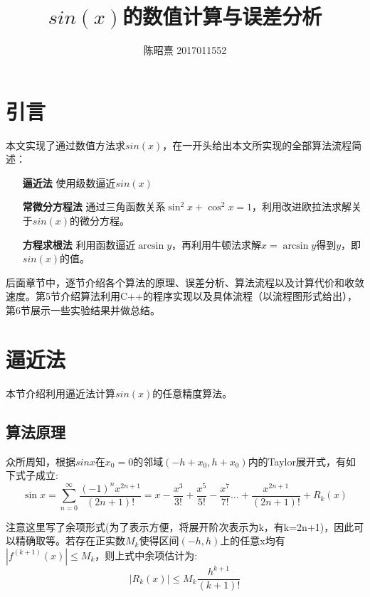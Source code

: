 \documentclass[UTF8]{ctexart}
\begin{document}
\title{$sin(x)$的数值计算与误差分析}
\author{陈昭熹 2017011552}
\maketitle
\tableofcontents
\newpage

\section{引言}
本文实现了通过数值方法求$sin(x)$，在一开头给出本文所实现的全部算法流程简述：
\begin{itemize}
    \item[\textbf{逼近法}] 使用级数逼近$sin(x)$
    \item[\textbf{常微分方程法}]通过三角函数关系$\sin^2{x}+\cos^2{x}=1$，利用改进欧拉法求解关于$sin(x)$的微分方程。
    \item[\textbf{方程求根法}] 利用函数逼近$\arcsin{y}$，再利用牛顿法求解$x=\arcsin{y}$得到$y$，即$sin(x)$的值。
\end{itemize}

后面章节中，逐节介绍各个算法的原理、误差分析、算法流程以及计算代价和收敛速度。第5节介绍算法利用C++的程序实现以及具体流程（以流程图形式给出），第6节展示一些实验结果并做总结。

\section{逼近法}

本节介绍利用逼近法计算$sin(x)$的任意精度算法。

\subsection{算法原理}

众所周知，根据$sinx$在$x_0=0$的邻域$(-h+x_0,h+x_0)$内的Taylor展开式，有如下式子成立:
\begin{equation}
    \sin{x} = \sum^\infty_{n=0} \frac{(-1)^nx^{2n+1}}{(2n+1)!}=x-\frac{x^3}{3!}+\frac{x^5}{5!}-\frac{x^7}{7!} \dots + \frac{x^{2n+1}}{(2n+1)!}+R_k(x)
\end{equation}

注意这里写了余项形式(为了表示方便，将展开阶次表示为k，有k=2n+1)，因此可以精确取等。若存在正实数$M_k$使得区间$(-h,h)$上的任意x均有$|f^{(k+1)}(x)|\leq M_k$，则上式中余项估计为:
\begin{equation}
    |R_k(x)|\leq M_k \frac{h^{k+1}}{(k+1)!}
\end{equation}
\end{document}
